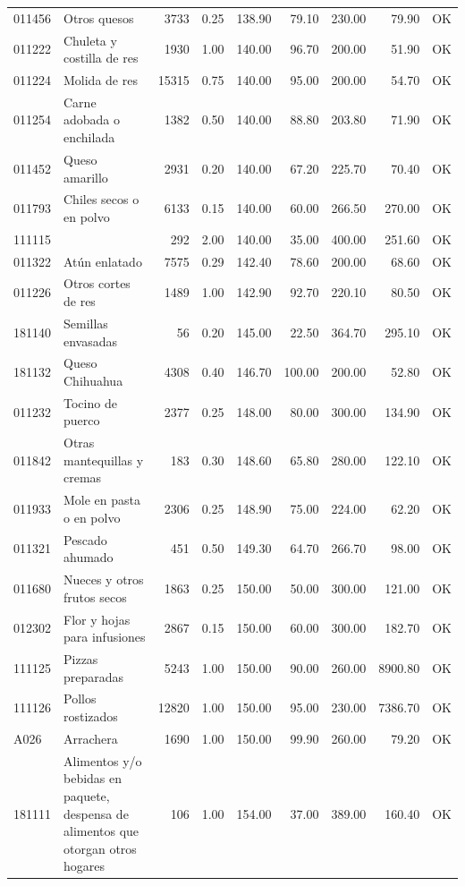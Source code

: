 \begin{table}[ht]
\begin{tabular}{llrrrrrrl}
  011456 & Otros quesos & 3733 & 0.25 & 138.90 & 79.10 & 230.00 & 79.90 & OK \\ 
  011222 & Chuleta y costilla de res & 1930 & 1.00 & 140.00 & 96.70 & 200.00 & 51.90 & OK \\ 
  011224 & Molida de res & 15315 & 0.75 & 140.00 & 95.00 & 200.00 & 54.70 & OK \\ 
  011254 & Carne adobada o enchilada & 1382 & 0.50 & 140.00 & 88.80 & 203.80 & 71.90 & OK \\ 
  011452 & Queso amarillo & 2931 & 0.20 & 140.00 & 67.20 & 225.70 & 70.40 & OK \\ 
  011793 & Chiles secos o en polvo & 6133 & 0.15 & 140.00 & 60.00 & 266.50 & 270.00 & OK \\ 
  111115 &  & 292 & 2.00 & 140.00 & 35.00 & 400.00 & 251.60 & OK \\ 
  011322 & Atún enlatado & 7575 & 0.29 & 142.40 & 78.60 & 200.00 & 68.60 & OK \\ 
  011226 & Otros cortes de res & 1489 & 1.00 & 142.90 & 92.70 & 220.10 & 80.50 & OK \\ 
  181140 & Semillas envasadas &  56 & 0.20 & 145.00 & 22.50 & 364.70 & 295.10 & OK \\ 
  181132 & Queso Chihuahua & 4308 & 0.40 & 146.70 & 100.00 & 200.00 & 52.80 & OK \\ 
  011232 & Tocino de puerco & 2377 & 0.25 & 148.00 & 80.00 & 300.00 & 134.90 & OK \\ 
  011842 & Otras mantequillas y cremas & 183 & 0.30 & 148.60 & 65.80 & 280.00 & 122.10 & OK \\ 
  011933 & Mole en pasta o en polvo & 2306 & 0.25 & 148.90 & 75.00 & 224.00 & 62.20 & OK \\ 
  011321 & Pescado ahumado & 451 & 0.50 & 149.30 & 64.70 & 266.70 & 98.00 & OK \\ 
  011680 & Nueces y otros frutos secos & 1863 & 0.25 & 150.00 & 50.00 & 300.00 & 121.00 & OK \\ 
  012302 & Flor y hojas para infusiones & 2867 & 0.15 & 150.00 & 60.00 & 300.00 & 182.70 & OK \\ 
  111125 & Pizzas preparadas & 5243 & 1.00 & 150.00 & 90.00 & 260.00 & 8900.80 & OK \\ 
  111126 & Pollos rostizados & 12820 & 1.00 & 150.00 & 95.00 & 230.00 & 7386.70 & OK \\ 
  A026 & Arrachera & 1690 & 1.00 & 150.00 & 99.90 & 260.00 & 79.20 & OK \\ 
  181111 & Alimentos y/o bebidas en paquete, despensa de alimentos que otorgan otros hogares & 106 & 1.00 & 154.00 & 37.00 & 389.00 & 160.40 & OK \\ 

\end{tabular}
\end{table}
